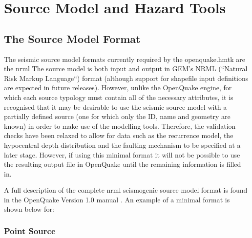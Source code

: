 \section{Source Model and Hazard Tools}

\subsection{The Source Model Format}

The seismic source model formats currently required by the openquake.hmtk are the nrml  The source model is both input and output in GEM's NRML (``Natural Risk Markup Language``) format (although support for shapefile input definitions are expected in future releases). However, unlike the OpenQuake engine, for which each source typology must contain all of the necessary attributes, it is recognised that it may be desirable to use the seismic source model with a partially defined source (one for which only the ID, name and geometry are known) in order to make use of the modelling tools. Therefore, the validation checks have been relaxed to allow for data such as the recurrence model, the hypocentral depth distribution and the faulting mechanism to be specified at a later stage. However, if using this minimal format it will not be possible to use the resulting output file in OpenQuake until the remaining information is filled in.  

A full description of the complete nrml seismogenic source model format is found in the OpenQuake Version 1.0 manual \parencite{crowley2010}. An example of a minimal format is shown below for:

\subsubsection{Point Source}

